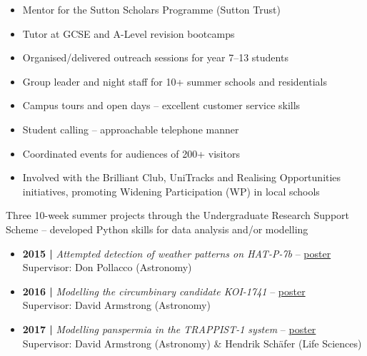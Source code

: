 \documentclass[10pt,a4paper]{altacv}
\begin{document}
\begin{itemize}
	\item Mentor for the Sutton Scholars Programme (Sutton Trust)
	\item Tutor at GCSE and A-Level revision bootcamps
	\item Organised/delivered outreach sessions for year 7--13 students
	\item Group leader and night staff for 10+ summer schools and residentials
	\item Campus tours and open days -- excellent customer service skills
	\item Student calling -- approachable telephone manner
	\item Coordinated events for audiences of 200+ visitors
	\item Involved with the Brilliant Club, UniTracks and Realising Opportunities initiatives, promoting Widening Participation (WP) in local schools
\end{itemize}

\divider


\small Three 10-week summer projects through the Undergraduate Research Support Scheme -- developed Python skills for data analysis and/or modelling

\smallskip

\begin{itemize}
	\item \textbf{2015 |} \textit{Attempted detection of weather patterns on HAT-P-7b} -- \href{https://warwick.ac.uk/fac/sci/physics/research/astro/people/jamesblake/urss_poster_2015_jb.pdf}{poster} \\
	Supervisor: Don Pollacco (Astronomy)
	\item \textbf{2016 |} \textit{Modelling the circumbinary candidate KOI-1741} -- \href{https://warwick.ac.uk/fac/sci/physics/research/astro/people/jamesblake/urss_poster_2016_jb.pdf}{poster} \\
	Supervisor: David Armstrong (Astronomy)
	\item \textbf{2017 |} \textit{Modelling panspermia in the TRAPPIST-1 system} -- \href{https://warwick.ac.uk/fac/sci/physics/research/astro/people/jamesblake/urss_poster_2017_jb.pdf}{poster} \\
	Supervisor: David Armstrong (Astronomy) \& Hendrik Sch{\"a}fer (Life Sciences)
\end{itemize}
\end{document}
